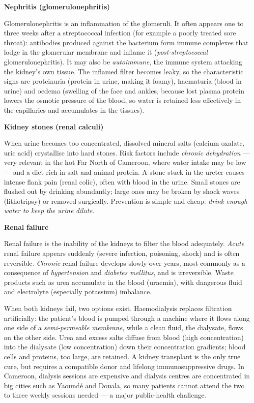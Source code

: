 \documentclass[11pt]{article}
\newcommand{\cle}[1]{{\popxbold\color{popdark}#1}}
\begin{document}
\textbf{Nephritis (glomerulonephritis)}\par
\cle{Glomerulonephritis} is an inflammation of the glomeruli. It often appears one to three weeks after a streptococcal infection (for example a poorly treated sore throat): antibodies produced against the bacterium form immune complexes that lodge in the glomerular membrane and inflame it (\emph{post-streptococcal} glomerulonephritis). It may also be \emph{autoimmune}, the immune system attacking the kidney's own tissue. The inflamed filter becomes leaky, so the characteristic signs are \cle{proteinuria} (protein in urine, making it foamy), \cle{haematuria} (blood in urine) and \cle{oedema} (swelling of the face and ankles, because lost plasma protein lowers the osmotic pressure of the blood, so water is retained less effectively in the capillaries and accumulates in the tissues).

\textbf{Kidney stones (renal calculi)}\par
When urine becomes too concentrated, dissolved mineral salts (calcium oxalate, uric acid) crystallise into hard stones. Risk factors include \emph{chronic dehydration} — very relevant in the hot Far North of Cameroon, where water intake may be low — and a diet rich in salt and animal protein. A stone stuck in the ureter causes intense \cle{flank pain} (renal colic), often with blood in the urine. Small stones are flushed out by drinking abundantly; large ones may be broken by shock waves (lithotripsy) or removed surgically. Prevention is simple and cheap: \emph{drink enough water to keep the urine dilute}.

\textbf{Renal failure}\par

\begin{definition}
\cle{Renal failure} is the inability of the kidneys to filter the blood adequately. \emph{Acute} renal failure appears suddenly (severe infection, poisoning, shock) and is often reversible. \emph{Chronic} renal failure develops slowly over years, most commonly as a consequence of \emph{hypertension} and \emph{diabetes mellitus}, and is irreversible. Waste products such as urea accumulate in the blood (\cle{uraemia}), with dangerous fluid and electrolyte (especially potassium) imbalance.
\end{definition}

When both kidneys fail, two options exist. \cle{Haemodialysis} replaces filtration artificially: the patient's blood is pumped through a machine where it flows along one side of a \emph{semi-permeable membrane}, while a clean fluid, the \cle{dialysate}, flows on the other side. Urea and excess salts diffuse from blood (high concentration) into the dialysate (low concentration) down their concentration gradients; blood cells and proteins, too large, are retained. A kidney \cle{transplant} is the only true cure, but requires a compatible donor and lifelong immunosuppressive drugs. In Cameroon, dialysis sessions are expensive and dialysis centres are concentrated in big cities such as Yaound\'e and Douala, so many patients cannot attend the two to three weekly sessions needed — a major public-health challenge.
\end{document}
